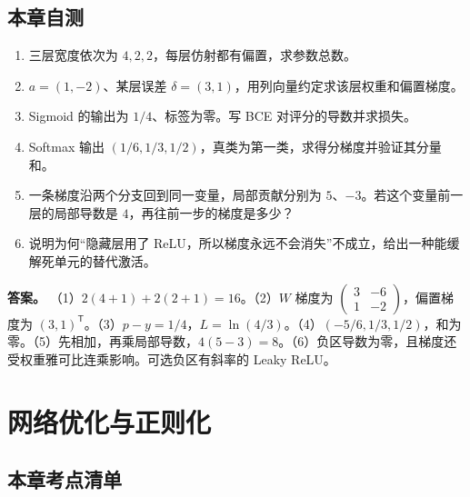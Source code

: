 \documentclass[UTF8,a4paper,zihao=-4,fontset=fandol]{ctexrep}
\begin{document}
\section{本章自测}

\begin{enumerate}
\item 三层宽度依次为 $4,2,2$，每层仿射都有偏置，求参数总数。
\item $a=(1,-2)$、某层误差 $\delta=(3,1)$，用列向量约定求该层权重和偏置梯度。
\item Sigmoid 的输出为 $1/4$、标签为零。写 BCE 对评分的导数并求损失。
\item Softmax 输出 $(1/6,1/3,1/2)$，真类为第一类，求得分梯度并验证其分量和。
\item 一条梯度沿两个分支回到同一变量，局部贡献分别为 $5$、$-3$。若这个变量前一层的局部导数是 $4$，再往前一步的梯度是多少？
\item 说明为何“隐藏层用了 ReLU，所以梯度永远不会消失”不成立，给出一种能缓解死单元的替代激活。
\end{enumerate}
\textbf{答案。} （1）$2(4+1)+2(2+1)=16$。（2）$W$ 梯度为 $\begin{pmatrix}3&-6\\1&-2\end{pmatrix}$，偏置梯度为 $(3,1)^{\mathsf T}$。（3）$p-y=1/4$，$L=\ln(4/3)$。（4）$(-5/6,1/3,1/2)$，和为零。（5）先相加，再乘局部导数，$4(5-3)=8$。（6）负区导数为零，且梯度还受权重雅可比连乘影响。可选负区有斜率的 Leaky ReLU。

\chapter{网络优化与正则化}

\section{本章考点清单}
\end{document}
